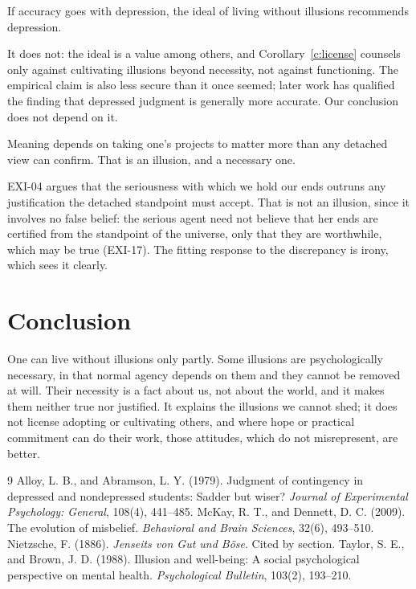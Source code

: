 \documentclass{situationist-preprint}
\begin{document}
\begin{objection}\label{o:depr}
If accuracy goes with depression, the ideal of living without illusions recommends depression.
\end{objection}

\begin{reply}
It does not: the ideal is a value among others, and Corollary~\ref{c:license} counsels only against cultivating illusions beyond necessity, not against functioning. The empirical claim is also less secure than it once seemed; later work has qualified the finding that depressed judgment is generally more accurate. Our conclusion does not depend on it.
\end{reply}

\begin{objection}\label{o:meaning}
Meaning depends on taking one's projects to matter more than any detached view can confirm. That is an illusion, and a necessary one.
\end{objection}

\begin{reply}
EXI-04 argues that the seriousness with which we hold our ends outruns any justification the detached standpoint must accept. That is not an illusion, since it involves no false belief: the serious agent need not believe that her ends are certified from the standpoint of the universe, only that they are worthwhile, which may be true (EXI-17). The fitting response to the discrepancy is irony, which sees it clearly.
\end{reply}

\section{Conclusion}

One can live without illusions only partly. Some illusions are psychologically necessary, in that normal agency depends on them and they cannot be removed at will. Their necessity is a fact about us, not about the world, and it makes them neither true nor justified. It explains the illusions we cannot shed; it does not license adopting or cultivating others, and where hope or practical commitment can do their work, those attitudes, which do not misrepresent, are better.

\begin{thebibliography}{9}\small
{} Alloy, L. B., and Abramson, L. Y. (1979). Judgment of contingency in depressed and nondepressed students: Sadder but wiser? \emph{Journal of Experimental Psychology: General}, 108(4), 441--485.
 McKay, R. T., and Dennett, D. C. (2009). The evolution of misbelief. \emph{Behavioral and Brain Sciences}, 32(6), 493--510.
 Nietzsche, F. (1886). \emph{Jenseits von Gut und B\"ose}. Cited by section.
 Taylor, S. E., and Brown, J. D. (1988). Illusion and well-being: A social psychological perspective on mental health. \emph{Psychological Bulletin}, 103(2), 193--210.
\end{thebibliography}
\end{document}
